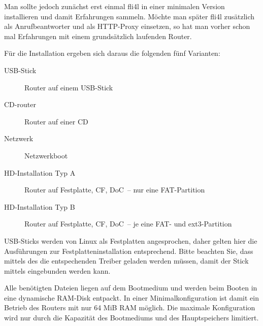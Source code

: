 Man sollte jedoch zunächst erst einmal fli4l in einer minimalen Version 
installieren und damit Erfahrungen sammeln. Möchte man später fli4l 
zusätzlich als Anrufbeantworter und als HTTP-Proxy einsetzen, so hat 
man vorher schon mal Erfahrungen mit einem grundsätzlich laufenden Router.

Für die Installation ergeben sich daraus die folgenden fünf Varianten:

\begin{description}
\item[USB-Stick] Router auf einem USB-Stick
\item[CD-router] Router auf einer CD
\item[Netzwerk] Netzwerkboot
\item[HD-Installation Typ A] Router auf Festplatte, CF, DoC~-- nur eine FAT-Partition
\item[HD-Installation Typ B] Router auf Festplatte, CF, DoC~-- je eine FAT- und ext3-Partition
\end{description}


USB-Sticks werden von Linux als Festplatten angesprochen, daher gelten hier
die Ausführungen zur Festplatteninstallation entsprechend. Bitte beachten Sie,
dass mittels des  die entspechenden Treiber geladen werden
müssen, damit der Stick mittels  eingebunden werden kann.


Alle benötigten Dateien liegen auf dem Bootmedium und werden beim
Booten in eine dynamische RAM-Disk entpackt.  In einer
Minimalkonfiguration ist damit ein Betrieb des Routers mit nur 64 MiB
RAM möglich. Die maximale Konfiguration wird nur durch die Kapazität
des Bootmediums und des Hauptspeichers limitiert.


